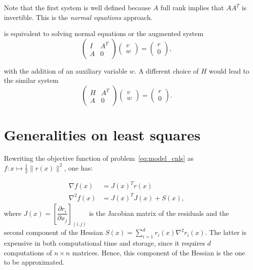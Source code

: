 \documentclass[10pt]{article}
\numberwithin{equation}{section}
\begin{document}
	 Note that the first system is well defined because $A$ full rank implies that $AA^T$ is invertible. This is the \textit{normal equations} approach. 
	 
	 is equivalent to solving normal equations or the augmented system
	 \[\begin{pmatrix}
	 	I & A^T \\
	 	A & 0
	 \end{pmatrix} \begin{pmatrix}
	 	v \\ w 
	 \end{pmatrix} = \begin{pmatrix}
	 	r \\ 0
	 \end{pmatrix},\]
	 
	 with the addition of an auxiliary variable $w$. A different choice of $H$ would lead to the similar system
	 \begin{equation}\label{eq:augmented_system_pcg}
	 	\begin{pmatrix}
	 		H & A^T \\
	 		A & 0
	 	\end{pmatrix} \begin{pmatrix}
	 		v \\ w 
	 	\end{pmatrix} = \begin{pmatrix}
	 		r \\ 0
	 	\end{pmatrix}.
	 \end{equation}
	 
	\section{Generalities on least squares}
	 
	 Rewriting the objective function of problem~\eqref{eq:model_cnls} as $f\colon x \mapsto  \frac{1}{2} \|r(x)\|^2$, one has:
	 
	 \begin{subequations}
	 		\begin{align}
	 		\nabla f(x) &= J(x)^Tr(x)\label{subeq:ls_grad} \\
	 		\nabla^2 f(x) &= J(x)^TJ(x) + S(x) , \label{subeq:ls_hessian}
	 		\end{align}
	 \end{subequations}
	 where $J(x) = \left[\dfrac{\partial r_i}{\partial x_j}\right]_{(i,j)}$ is the Jacobian matrix of the residuals and the second component of the Hessian $S(x) = \sum_{i=1}^{d} r_i(x) \nabla^2r_i(x) $. The latter is expensive in both computational time and storage, since it requires $d$ computations of $n\times n$ matrices. Hence, this component of the Hessian is the one to be approximated. 
	 
\end{document}
